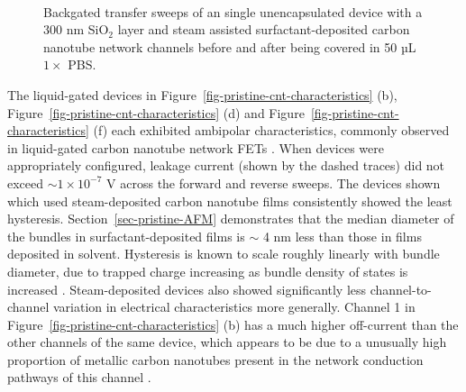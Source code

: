 \documentclass[
  a4paper,
]{scrbook}
\begin{document}
\begin{figure}
\begin{minipage}[t]{0.01\linewidth}
{\centering 

~

}

\end{minipage}%

\caption[Backgated transfer sweeps of an single unencapsulated device
before and after exposure to 50 µL \(1 \times\)
PBS.]{\label{fig-buffer-effect-on-backgate}Backgated transfer sweeps of
an single unencapsulated device with a 300 nm SiO\(_2\) layer and steam
assisted surfactant-deposited carbon nanotube network channels before
and after being covered in 50 µL \(1 \times\) PBS.}

\end{figure}

The liquid-gated devices in
Figure~\ref{fig-pristine-cnt-characteristics} (b),
Figure~\ref{fig-pristine-cnt-characteristics} (d) and
Figure~\ref{fig-pristine-cnt-characteristics} (f) each exhibited
ambipolar characteristics, commonly observed in liquid-gated carbon
nanotube network FETs
\autocite{Kauffman2008,Heller2009,JongYu2009,Derenskyi2014,Murugathas2018,Albarghouthi2022}.
When devices were appropriately configured, leakage current (shown by
the dashed traces) did not exceed \(\sim 1 \times 10^{-7}\) V across the
forward and reverse sweeps. The devices shown which used steam-deposited
carbon nanotube films consistently showed the least hysteresis.
Section~\ref{sec-pristine-AFM} demonstrates that the median diameter of
the bundles in surfactant-deposited films is \(\sim\) 4 nm less than
those in films deposited in solvent. Hysteresis is known to scale
roughly linearly with bundle diameter, due to trapped charge increasing
as bundle density of states is increased \autocite{Pop2009}.
Steam-deposited devices also showed significantly less
channel-to-channel variation in electrical characteristics more
generally. Channel 1 in Figure~\ref{fig-pristine-cnt-characteristics}
(b) has a much higher off-current than the other channels of the same
device, which appears to be due to a unusually high proportion of
metallic carbon nanotubes present in the network conduction pathways of
this channel \autocite{Rouhi2011,Zaumseil2015}.
\end{document}
